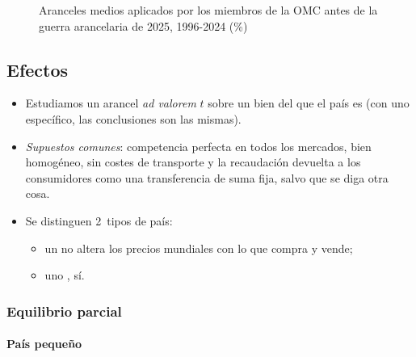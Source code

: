 \documentclass[11pt]{article}
\begin{document}
\begin{figure}[H]
\centering
\caption{Aranceles medios aplicados por los miembros de la OMC antes de la guerra arancelaria de 2025, 1996-2024 (\%)}\label{fig:aranceles-medios-mundo}
\end{figure}

\subsection{Efectos}\label{sec:efectos}

\begin{itemize}
\item Estudiamos un arancel \emph{ad valorem} $t$ sobre un bien del que el país es  (con uno específico, las conclusiones son las mismas).
\item \emph{Supuestos comunes}: competencia perfecta en todos los mercados, bien homogéneo, sin costes de transporte y la recaudación devuelta a los consumidores como una transferencia de suma fija, salvo que se diga otra cosa.
\item Se distinguen 2~tipos de país:
  \begin{itemize}
  \item un  no altera los precios mundiales con lo que compra y vende;
  \item uno , sí.
  \end{itemize}
\end{itemize}

\subsubsection{Equilibrio parcial}\label{sec:parcial}

\paragraph{País pequeño}
\end{document}
